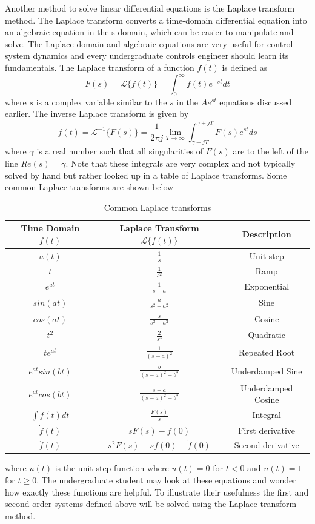 Another method to solve linear differential equations is the Laplace transform method. The Laplace transform converts a time-domain differential equation into an algebraic equation in the s-domain, which can be easier to manipulate and solve. The Laplace domain and algebraic equations are very useful for control system dynamics and every undergraduate controls engineer should learn its fundamentals. The Laplace transform of a function $f(t)$ is defined as 
\begin{equation}
    F(s) = \mathcal{L}\{f(t)\} = \int_0^{\infty} f(t) e^{-st} dt
\end{equation}
where $s$ is a complex variable similar to the $s$ in the $Ae^{st}$ equations discussed earlier. The inverse Laplace transform is given by 
\begin{equation}
    f(t) = \mathcal{L}^{-1}\{F(s)\} = \frac{1}{2\pi j} \lim_{T \to \infty} \int_{\gamma - jT}^{\gamma + jT} F(s) e^{st} ds
\end{equation}
where $\gamma$ is a real number such that all singularities of $F(s)$ are to the left of the line $Re(s) = \gamma$. Note that these integrals are very complex and not typically solved by hand but rather looked up in a table of Laplace transforms. Some common Laplace transforms are shown below
\renewcommand{\arraystretch}{1.5} %
\begin{table}[H]
\centering
\begin{tabular}{|c|c|c|}
\hline
Time Domain $f(t)$ & Laplace Transform $\mathcal{L}\{f(t)\}$ & Description \\
\hline
$u(t)$ & $\frac{1}{s}$ & Unit step \\
$t$ & $\frac{1}{s^2}$ & Ramp \\
$e^{at}$ & $\frac{1}{s-a}$ & Exponential \\
$sin(at)$ & $\frac{a}{s^2 + a^2}$ & Sine \\
$cos(at)$ & $\frac{s}{s^2 + a^2}$ & Cosine \\
$t^2$ & $\frac{2}{s^3}$ & Quadratic \\
$te^{at}$ & $\frac{1}{(s-a)^2}$ & Repeated Root \\
$e^{at}sin(bt)$ & $\frac{b}{(s-a)^2 + b^2}$ & Underdamped Sine \\
$e^{at}cos(bt)$ & $\frac{s-a}{(s-a)^2 + b^2}$ & Underdamped Cosine \\
$\int f(t) dt$ & $\frac{F(s)}{s}$ & Integral \\
$\dot{f}(t)$ & $sF(s) - f(0)$ & First derivative \\
$\ddot{f}(t)$ & $s^2F(s) - sf(0) - \dot{f}(0)$ & Second derivative \\
\hline
\end{tabular}
\caption{Common Laplace transforms}
\end{table}
\renewcommand{\arraystretch}{1} %
where $u(t)$ is the unit step function where $u(t)=0$ for $t<0$ and $u(t)=1$ for $t\geq0$. The undergraduate student may look at these equations and wonder how exactly these functions are helpful. To illustrate their usefulness the first and second order systems defined above will be solved using the Laplace transform method.

